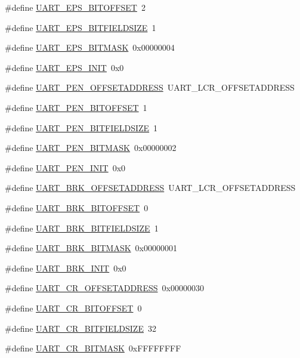 \begin{DoxyCompactItemize}
\item 
\#define \hyperlink{a00575_a4d2a78cef68208a93e7f34879cc6a089}{UART\_\-EPS\_\-BITOFFSET}~2
\item 
\#define \hyperlink{a00575_a715a9cafac82a74d690bd77dcca5c623}{UART\_\-EPS\_\-BITFIELDSIZE}~1
\item 
\#define \hyperlink{a00575_ac1b9720cbe1668b77ad7090f36ac93bd}{UART\_\-EPS\_\-BITMASK}~0x00000004
\item 
\#define \hyperlink{a00575_a96d0bdb9b0972cb72eb91ef5b9fdf98a}{UART\_\-EPS\_\-INIT}~0x0
\item 
\#define \hyperlink{a00575_aff428022d6befc12bc5a7b6b3221b42d}{UART\_\-PEN\_\-OFFSETADDRESS}~UART\_\-LCR\_\-OFFSETADDRESS
\item 
\#define \hyperlink{a00575_a7767f9caf706ad14f54e580db6fc84c4}{UART\_\-PEN\_\-BITOFFSET}~1
\item 
\#define \hyperlink{a00575_a877db9be97b34a48954e5e744eba29f5}{UART\_\-PEN\_\-BITFIELDSIZE}~1
\item 
\#define \hyperlink{a00575_aa8450284897f7ffe0a9b48131830d36e}{UART\_\-PEN\_\-BITMASK}~0x00000002
\item 
\#define \hyperlink{a00575_a88d5c65125b2d9d3206a69a9ab7965df}{UART\_\-PEN\_\-INIT}~0x0
\item 
\#define \hyperlink{a00575_a5daf79c9c8570407a784823e329e03e2}{UART\_\-BRK\_\-OFFSETADDRESS}~UART\_\-LCR\_\-OFFSETADDRESS
\item 
\#define \hyperlink{a00575_a00bd1977495e8221b270da43c8da199f}{UART\_\-BRK\_\-BITOFFSET}~0
\item 
\#define \hyperlink{a00575_a16232bfa6ebba3f5429f46b8785cdeb5}{UART\_\-BRK\_\-BITFIELDSIZE}~1
\item 
\#define \hyperlink{a00575_a49a01aea3caefdd66c6884d2d2213af4}{UART\_\-BRK\_\-BITMASK}~0x00000001
\item 
\#define \hyperlink{a00575_a5e3f83ced3ce71f83715834f6525864d}{UART\_\-BRK\_\-INIT}~0x0
\item 
\#define \hyperlink{a00575_a7c5da79127f15b373acdd760d97804f8}{UART\_\-CR\_\-OFFSETADDRESS}~0x00000030
\item 
\#define \hyperlink{a00575_aa7fb6e3b8d5935c326c8de3221a5128a}{UART\_\-CR\_\-BITOFFSET}~0
\item 
\#define \hyperlink{a00575_aa945e1931f08a5bf024c3070a546b650}{UART\_\-CR\_\-BITFIELDSIZE}~32
\item 
\#define \hyperlink{a00575_a2951c6c04fbdb7a1a78e4758bd08f4cc}{UART\_\-CR\_\-BITMASK}~0xFFFFFFFF
\item 

\end{DoxyCompactItemize}
